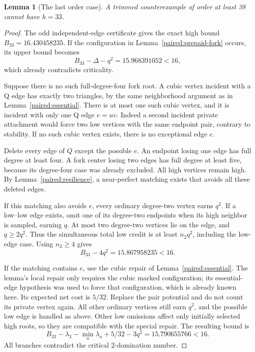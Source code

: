 \documentclass[11pt,a4paper]{article}
\newtheorem{lemma}[theorem]{Lemma}
\theoremstyle{definition}\newtheorem{definition}[theorem]{Definition}
\theoremstyle{remark}\newtheorem{remark}[theorem]{Remark}
\begin{document}
\begin{lemma}[The last order case]\label{paired:order37-h33}
A trimmed counterexample of order at least 38 cannot have $h=33$.
\end{lemma}
\begin{proof}
The odd independent-edge certificate gives the exact high bound
$B_{33}=16.430458235$. If the configuration in
Lemma~\ref{paired:prepaid-fork} occurs, its upper bound becomes
\[
 B_{33}-\Delta-q^2=15.968391052<16,
\]
which already contradicts criticality.

Suppose there is no such full-degree-four fork root. A cubic vertex
incident with a Q edge has exactly two triangles, by the same
neighborhood argument as in Lemma~\ref{paired:essential}. There is
at most one such cubic vertex, and it is incident with only one
Q edge $e=uv$. Indeed a second incident private attachment would
force two low vertices with the same endpoint pair, contrary to
stability. If no such cubic vertex exists, there is no exceptional
edge $e$.

Delete every edge of $Q$ except the possible $e$. An endpoint losing
one edge has full degree at least four. A fork center losing two
edges has full degree at least five, because its degree-four case
was already excluded. All high vertices remain high. By
Lemma~\ref{paired:resilience}, a near-perfect matching exists that
avoids all these deleted edges.

If this matching also avoids $e$, every ordinary degree-two vertex
earns $q^2$. If a low--low edge exists, omit one of its degree-two
endpoints when its high neighbor is sampled, earning $q$. At most
two degree-two vertices lie on the edge, and $q\ge2q^2$. Thus the
simultaneous total low credit is at least $n_2q^2$, including the
low-edge case. Using $n_2\ge4$ gives
\[
 B_{33}-4q^2=15.867958235<16.
\]

If the matching contains $e$, use the cubic repair of
Lemma~\ref{paired:essential}. The lemma's local repair only requires
the cubic marked configuration; its essential-edge hypothesis was
used to force that configuration, which is already known here.
Its expected net cost is $5/32$. Replace the pair potential and
do not count its private vertex again. All other ordinary vertices
still earn $q^2$, and the possible low edge is handled as above.
Other low omissions affect only initially selected high roots, so
they are compatible with the special repair. The resulting bound is
\[
 B_{33}-\lambda_3-\min_a\lambda_a+5/32-3q^2
 =15.790655766<16.
\]
All branches contradict the critical 2-domination number.
\end{proof}
\end{document}
